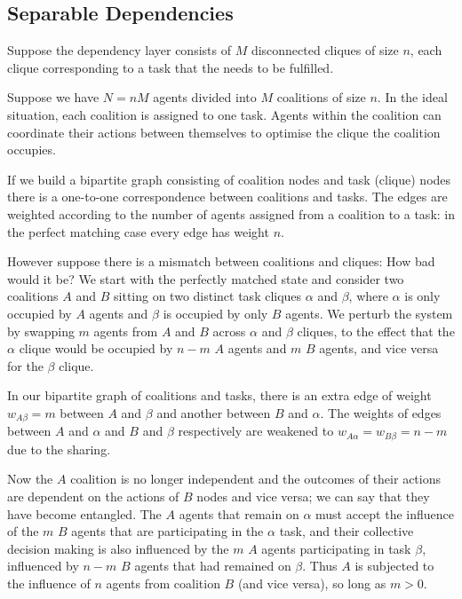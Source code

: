\subsection{Separable Dependencies}
Suppose the dependency layer consists of $M$ disconnected cliques of size $n$, each clique corresponding to a task that the needs to be fulfilled.

Suppose we have $N = nM$ agents divided into $M$ coalitions of size $n$. In the ideal situation, each coalition is assigned to one task. Agents within the coalition can coordinate their actions between themselves to optimise the clique the coalition occupies.

If we build a bipartite graph consisting of coalition nodes and task (clique) nodes there is a one-to-one correspondence between coalitions and tasks. The edges are weighted according to the number of agents assigned from a coalition to a task: in the perfect matching case every edge has weight $n$.

However suppose there is a mismatch between coalitions and cliques: How bad would it be? We start with the perfectly matched state and consider two coalitions $A$ and $B$ sitting on two distinct task cliques $\alpha$ and $\beta$, where $\alpha$ is only occupied by $A$ agents and $\beta$ is occupied by only $B$ agents. We perturb the system by swapping $m$ agents from $A$ and $B$ across $\alpha$ and $\beta$ cliques, to the effect that the $\alpha$ clique would be occupied by $n-m$ $A$ agents and $m$ $B$ agents, and vice versa for the $\beta$ clique.

In our bipartite graph of coalitions and tasks, there is an extra edge of weight $w_{A\beta} = m$ between $A$ and $\beta$ and another between $B$ and $\alpha$. The weights of edges between $A$ and $\alpha$ and $B$ and $\beta$ respectively are weakened to $w_{A\alpha} = w_{B\beta} = n-m$ due to the sharing.

Now the $A$ coalition is no longer independent and the outcomes of their actions are dependent on the actions of $B$ nodes and vice versa; we can say that they have become entangled. The $A$ agents that remain on $\alpha$ must accept the influence of the $m$ $B$ agents that are participating in the $\alpha$ task, and their collective decision making is also influenced by the $m$ $A$ agents participating in task $\beta$, influenced by $n-m$ $B$ agents that had remained on $\beta$. Thus $A$ is subjected to the influence of $n$ agents from coalition $B$ (and vice versa), so long as $m >0$.

